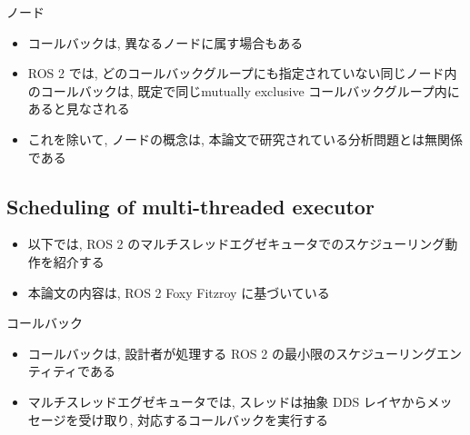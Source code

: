 \begin{frame}{ノード}
    \begin{itemize}
        \item コールバックは, 異なるノードに属す場合もある
        \item ROS 2 では, どのコールバックグループにも指定されていない同じノード内のコールバックは, 既定で同じmutually exclusive コールバックグループ内にあると見なされる
        \item これを除いて, ノードの概念は, 本論文で研究されている分析問題とは無関係である
    \end{itemize}

\end{frame}


\subsection{Scheduling of multi-threaded executor}
\label{ssec: scheduling_of_multi_threaded_executor}

\begin{frame}{}
    \begin{itemize}
        \item 以下では, ROS 2 のマルチスレッドエグゼキュータでのスケジューリング動作を紹介する
        \item 本論文の内容は, ROS 2 Foxy Fitzroy に基づいている
    \end{itemize}

\end{frame}

\begin{frame}{コールバック}
    \begin{itemize}
        \item コールバックは, 設計者が処理する ROS 2 の最小限のスケジューリングエンティティである
        \item マルチスレッドエグゼキュータでは, スレッドは抽象 DDS レイヤからメッセージを受け取り, 対応するコールバックを実行する
    \end{itemize}
\end{frame}

